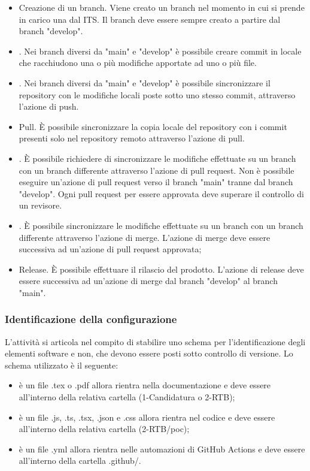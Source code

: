 \begin{itemize}
    \item Creazione di un branch. Viene creato un branch nel momento in cui si prende in carico una  dal ITS. Il branch deve essere sempre creato a partire dal branch "develop".
    \item {}. Nei branch diversi da "main" e "develop" è possibile creare commit in locale che racchiudono una o più modifiche apportate ad uno o più file.
    \item {}. Nei branch diversi da "main" e "develop" è possibile sincronizzare il repository con le modifiche locali poste sotto uno stesso commit, attraverso l'azione di push.
    \item Pull. È possibile sincronizzare la copia locale del repository con i commit presenti solo nel repository remoto attraverso l'azione di pull.
    \item {}. È possibile richiedere di sincronizzare le modifiche effettuate su un branch con un branch differente attraverso l'azione di pull request. Non è possibile eseguire un'azione di pull request verso il branch "main" tranne dal branch "develop". Ogni pull request per essere approvata deve superare il controllo di un revisore. 
    \item {}. È possibile sincronizzare le modifiche effettuate su un branch con un branch differente attraverso l'azione di merge. L'azione di merge deve essere successiva ad un'azione di pull request approvata;
    \item Release. È possibile effettuare il rilascio del prodotto. L'azione di release deve essere successiva ad un'azione di merge dal branch "develop" al branch "main". 
\end{itemize}

\subsubsection{Identificazione della configurazione}
L'attività si articola nel compito di stabilire uno schema per l'identificazione degli elementi software e non, che devono essere posti sotto controllo di versione. Lo schema utilizzato è il seguente:
\begin{itemize}
    \item è un file .tex o .pdf allora rientra nella documentazione e deve essere all'interno della relativa cartella (1-Candidatura o 2-RTB);
    \item è un file .js, .ts, .tsx, .json e .css allora rientra nel codice e deve essere all'interno della relativa cartella (2-RTB/poc);
    \item è un file .yml allora rientra nelle automazioni di GitHub Actions e deve essere all'interno della cartella .github/.
\end{itemize}

